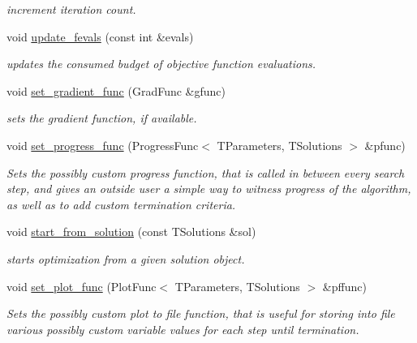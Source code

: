 \begin{DoxyCompactItemize}
\begin{DoxyCompactList}\small\item\em increment iteration count. \end{DoxyCompactList}\item 
void \hyperlink{classlibcmaes_1_1ESOStrategy_a9cfe783dc0284fce441c8757cd5222c3}{update\-\_\-fevals} (const int \&evals)
\begin{DoxyCompactList}\small\item\em updates the consumed budget of objective function evaluations. \end{DoxyCompactList}\item 
void \hyperlink{classlibcmaes_1_1ESOStrategy_aecb8aeecb2053868a7d9237223067267}{set\-\_\-gradient\-\_\-func} (Grad\-Func \&gfunc)
\begin{DoxyCompactList}\small\item\em sets the gradient function, if available. \end{DoxyCompactList}\item 
void \hyperlink{classlibcmaes_1_1ESOStrategy_a9d44ba79106b6afbd5881c4f33800840}{set\-\_\-progress\-\_\-func} (Progress\-Func$<$ T\-Parameters, T\-Solutions $>$ \&pfunc)
\begin{DoxyCompactList}\small\item\em Sets the possibly custom progress function, that is called in between every search step, and gives an outside user a simple way to witness progress of the algorithm, as well as to add custom termination criteria. \end{DoxyCompactList}\item 
void \hyperlink{classlibcmaes_1_1ESOStrategy_afa0e2a388dae01ec485c3dd8d80bb5ed}{start\-\_\-from\-\_\-solution} (const T\-Solutions \&sol)
\begin{DoxyCompactList}\small\item\em starts optimization from a given solution object. \end{DoxyCompactList}\item 
void \hyperlink{classlibcmaes_1_1ESOStrategy_ac0cdfca8b5614843661af4153e8c6b51}{set\-\_\-plot\-\_\-func} (Plot\-Func$<$ T\-Parameters, T\-Solutions $>$ \&pffunc)
\begin{DoxyCompactList}\small\item\em Sets the possibly custom plot to file function, that is useful for storing into file various possibly custom variable values for each step until termination. \end{DoxyCompactList}\item 

\end{DoxyCompactItemize}
